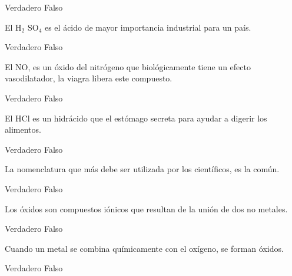 \begin{multicols}{2}
\begin{parts}
        \begin{oneparchoices}
            \choice Verdadero
            \choice Falso
        \end{oneparchoices}

        El H$_2$ SO$_4$ es el ácido de mayor importancia industrial
        para un país.

        \begin{oneparchoices}
            \choice Verdadero
            \choice Falso
        \end{oneparchoices}

        El NO, es un óxido del nitrógeno que biológicamente tiene un efecto vasodilatador, la
        viagra libera este compuesto.

        \begin{oneparchoices}
            \choice Verdadero
            \choice Falso
        \end{oneparchoices}

        El HCl es un hidrácido que el
        estómago secreta para ayudar a digerir los alimentos.

        \begin{oneparchoices}
            \choice Verdadero
            \choice Falso
        \end{oneparchoices}

        La nomenclatura que más
        debe ser utilizada por los
        científicos, es la común.


        \begin{oneparchoices}
            \choice Verdadero
            \choice Falso
        \end{oneparchoices}

        Los óxidos son compuestos iónicos que resultan
        de la unión de dos no
        metales.

        \begin{oneparchoices}
            \choice Verdadero
            \choice Falso
        \end{oneparchoices}

        Cuando un metal se
        combina químicamente
        con el oxígeno, se forman óxidos.

        \begin{oneparchoices}
            \choice Verdadero
            \choice Falso
        \end{oneparchoices}
    \end{parts}

\end{multicols}